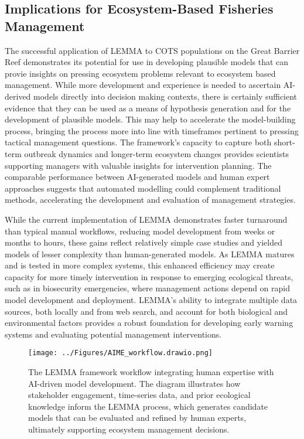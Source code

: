 \subsection{Implications for Ecosystem-Based Fisheries Management}

The successful application of LEMMA to COTS populations on the Great Barrier Reef demonstrates its potential for use in developing plausible models that can provie insights on pressing ecosystem problems relevant to ecosystem based management. While more development and experience is needed to ascertain AI-derived models directly into decision making contexts, there is certainly sufficient evidence that they can be used as a means of
hypothesis generation and for the development of plausible models. This may help to accelerate the model-building process, bringing the process more into line with timeframes pertinent to pressing tactical management questions. The framework's capacity to capture both short-term outbreak dynamics and longer-term ecosystem changes provides scientists supporting managers with valuable insights for intervention planning. The comparable performance between AI-generated models and human expert approaches suggests that automated modelling could complement traditional methods, accelerating the development and evaluation of management strategies.

While the current implementation of LEMMA demonstrates faster turnaround than typical manual workflows, reducing model development from weeks or months to hours, these gains reflect relatively simple case studies and yielded models of lesser complexity than human-generated models. As LEMMA matures and is tested in more complex systems, this enhanced efficiency may create capacity for more timely intervention in response to emerging ecological threats, such as in biosecurity emergencies, where management actions depend on rapid model development and deployment. LEMMA's ability to integrate multiple data sources, both locally and from web search, and account for both biological and environmental factors provides a robust foundation for developing early warning systems and evaluating potential management interventions.\

\begin{figure}[htbp]
    \centering
    \texttt{[image: ../Figures/AIME\_workflow.drawio.png]}
    \caption{The LEMMA framework workflow integrating human expertise with AI-driven model development. The diagram illustrates how stakeholder engagement, time-series data, and prior ecological knowledge inform the LEMMA process, which generates candidate models that can be evaluated and refined by human experts, ultimately supporting ecosystem management decisions.}
    \label{fig:aime_workflow}
\end{figure}


